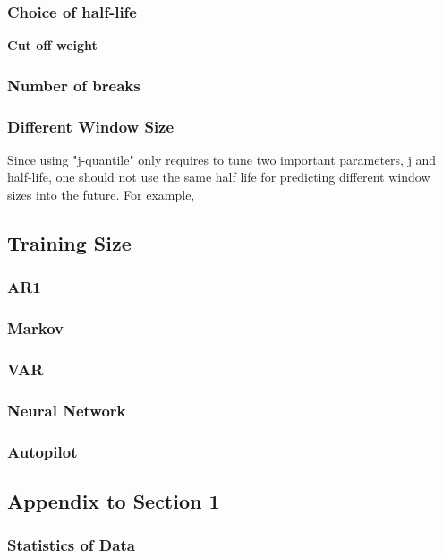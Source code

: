 \documentclass{article}
\begin{document}
\subsubsection{Choice of half-life}

\textbf{Cut off weight}

\subsubsection{Number of breaks}

\subsubsection{Different Window Size}
Since using "j-quantile" only requires to tune two important parameters, j and
half-life, one should not use the same half life for predicting different window
sizes into the future. For example, 

\subsection{Training Size}

\subsubsection{AR1}

\subsubsection{Markov}

\subsubsection{VAR}

\subsubsection{Neural Network}

\subsubsection{Autopilot}

\subsection{Appendix to Section 1}

\subsubsection{Statistics of Data}
\end{document}
